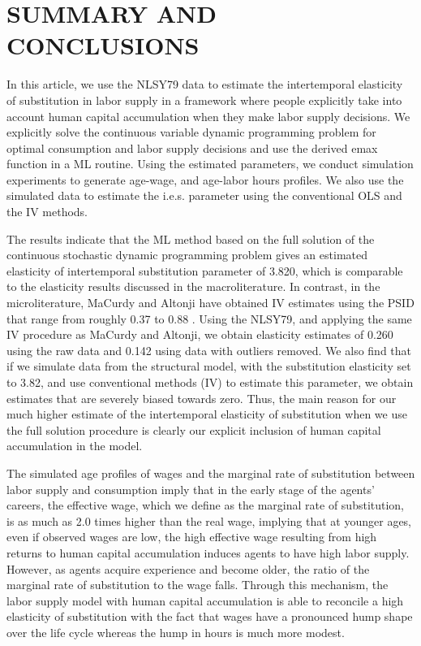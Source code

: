 \documentclass{article}
\begin{document}
\section{SUMMARY AND CONCLUSIONS}
\label{section:conclusions}
In this article, we use the NLSY79 data to estimate the intertemporal elasticity of substitution in labor supply in a framework where people explicitly take into account human capital accumulation when they make labor supply decisions. We explicitly solve the continuous variable dynamic programming problem for optimal consumption and labor supply decisions and use the derived emax function in a ML routine. Using the estimated parameters, we conduct simulation experiments to generate age-wage, and age-labor hours profiles. We also use the simulated data to estimate the i.e.s. parameter using the conventional OLS and the IV methods. \par
The results indicate that the ML method based on the full solution of the continuous stochastic dynamic programming problem gives an estimated elasticity of intertemporal substitution parameter of 3.820, which is comparable to the elasticity results discussed in the macroliterature. In contrast, in the microliterature, MaCurdy and Altonji have obtained IV estimates using the PSID that range from roughly 0.37 to 0.88 . Using the NLSY79, and applying the same IV procedure as MaCurdy and Altonji, we obtain elasticity estimates of 0.260 using the raw data and 0.142 using data with outliers removed. We also find that if we simulate data from the structural model, with the substitution elasticity set to 3.82, and use conventional methods (IV) to estimate this parameter, we obtain estimates that are severely biased towards zero. Thus, the main reason for our much higher estimate of the intertemporal elasticity of substitution when we use the full solution procedure is clearly our explicit inclusion of human capital accumulation in the model. \par
The simulated age profiles of wages and the marginal rate of substitution between labor supply and consumption imply that in the early stage of the agents' careers, the effective wage, which we define as the marginal rate of substitution, is as much as 2.0 times higher than the real wage, implying that at younger ages, even if observed wages are low, the high effective wage resulting from high returns to human capital accumulation induces agents to have high labor supply. However, as agents acquire experience and become older, the ratio of the marginal rate of substitution to the wage falls. Through this mechanism, the labor supply model with human capital accumulation is able to reconcile a high elasticity of substitution with the fact that wages have a pronounced hump shape over the life cycle whereas the hump in hours is much more modest. \par
\end{document}
